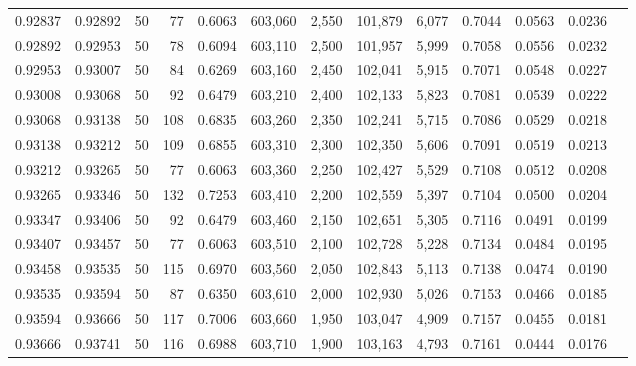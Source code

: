\begin{tabular}{rrrrrrrrrrrrr}
0.92837 & 0.92892 &    50 &  77 &                                     0.6063 & 603,060 &   2,550 & 101,879 &   6,077 & 0.7044 & 0.0563 & 0.0236 \\
0.92892 & 0.92953 &    50 &  78 &                                     0.6094 & 603,110 &   2,500 & 101,957 &   5,999 & 0.7058 & 0.0556 & 0.0232 \\
0.92953 & 0.93007 &    50 &  84 &                                     0.6269 & 603,160 &   2,450 & 102,041 &   5,915 & 0.7071 & 0.0548 & 0.0227 \\
0.93008 & 0.93068 &    50 &  92 &                                     0.6479 & 603,210 &   2,400 & 102,133 &   5,823 & 0.7081 & 0.0539 & 0.0222 \\
0.93068 & 0.93138 &    50 & 108 &                                     0.6835 & 603,260 &   2,350 & 102,241 &   5,715 & 0.7086 & 0.0529 & 0.0218 \\
0.93138 & 0.93212 &    50 & 109 &                                     0.6855 & 603,310 &   2,300 & 102,350 &   5,606 & 0.7091 & 0.0519 & 0.0213 \\
0.93212 & 0.93265 &    50 &  77 &                                     0.6063 & 603,360 &   2,250 & 102,427 &   5,529 & 0.7108 & 0.0512 & 0.0208 \\
0.93265 & 0.93346 &    50 & 132 &                                     0.7253 & 603,410 &   2,200 & 102,559 &   5,397 & 0.7104 & 0.0500 & 0.0204 \\
0.93347 & 0.93406 &    50 &  92 &                                     0.6479 & 603,460 &   2,150 & 102,651 &   5,305 & 0.7116 & 0.0491 & 0.0199 \\
0.93407 & 0.93457 &    50 &  77 &                                     0.6063 & 603,510 &   2,100 & 102,728 &   5,228 & 0.7134 & 0.0484 & 0.0195 \\
0.93458 & 0.93535 &    50 & 115 &                                     0.6970 & 603,560 &   2,050 & 102,843 &   5,113 & 0.7138 & 0.0474 & 0.0190 \\
0.93535 & 0.93594 &    50 &  87 &                                     0.6350 & 603,610 &   2,000 & 102,930 &   5,026 & 0.7153 & 0.0466 & 0.0185 \\
0.93594 & 0.93666 &    50 & 117 &                                     0.7006 & 603,660 &   1,950 & 103,047 &   4,909 & 0.7157 & 0.0455 & 0.0181 \\
0.93666 & 0.93741 &    50 & 116 &                                     0.6988 & 603,710 &   1,900 & 103,163 &   4,793 & 0.7161 & 0.0444 & 0.0176 \\

\end{tabular}
